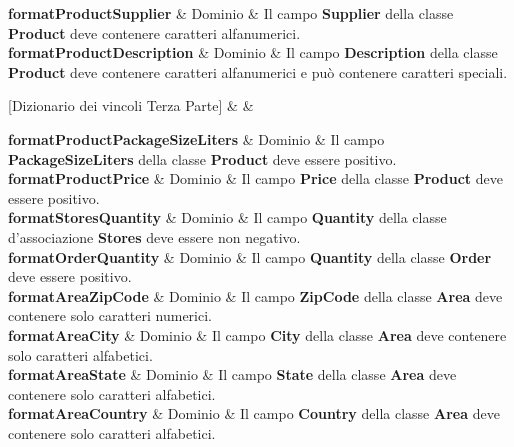 {  \textbf{formatProductSupplier} & Dominio  & 
  {\footnotesize
  Il campo \textbf{Supplier} della classe \textbf{Product} deve contenere caratteri alfanumerici.
  }\\
  
  \textbf{formatProductDescription} & Dominio & 
  {\footnotesize
  Il campo \textbf{Description} della classe \textbf{Product} deve contenere caratteri alfanumerici e può contenere caratteri speciali. 
  }\\
  
}

[Dizionario dei vincoli Terza Parte]{ &  & }{
    
  \textbf{formatProductPackageSizeLiters} & Dominio & 
  {\footnotesize
  Il campo \textbf{PackageSizeLiters} della classe \textbf{Product} deve essere positivo.
  }\\ 

  \textbf{formatProductPrice} & Dominio & 
  {\footnotesize
  Il campo \textbf{Price} della classe \textbf{Product} deve essere positivo.
  }\\

  \textbf{formatStoresQuantity} & Dominio & 
  {\footnotesize
  Il campo \textbf{Quantity} della classe d'associazione \textbf{Stores} deve essere non negativo.
  }\\ %

  \textbf{formatOrderQuantity} & Dominio & 
  {\footnotesize
  Il campo \textbf{Quantity} della classe \textbf{Order} deve essere positivo.
  }\\

  \textbf{formatAreaZipCode} & Dominio & 
  {\footnotesize
  Il campo \textbf{ZipCode} della classe \textbf{Area} deve contenere solo caratteri numerici.
  }\\

  \textbf{formatAreaCity} & Dominio & 
  {\footnotesize
  Il campo \textbf{City} della classe \textbf{Area} deve contenere solo caratteri alfabetici.
  }\\
  
  \textbf{formatAreaState} & Dominio & 
  {\footnotesize
  Il campo \textbf{State} della classe \textbf{Area} deve contenere solo caratteri alfabetici.
  }\\
  
  \textbf{formatAreaCountry} & Dominio & 
  {\footnotesize
  Il campo \textbf{Country} della classe \textbf{Area} deve contenere solo caratteri alfabetici.
  }\\
  
}
